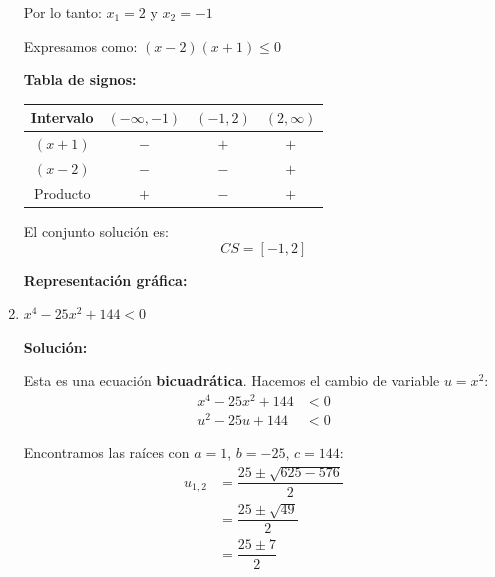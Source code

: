 \documentclass[12pt]{article}
\newcommand{\solucion}{%
    \vspace{0.8em}%
    \textbf{Solución:}%
}
\begin{document}
\begin{enumerate}[label=\alph*.-]
    Por lo tanto: $x_1 = 2$ y $x_2 = -1$

    Expresamos como: $(x - 2)(x + 1) \leq 0$

    \textbf{Tabla de signos:}

    \begin{center}
    \begin{tabular}{|c|c|c|c|}
    \hline
    Intervalo & $(-\infty, -1)$ & $(-1, 2)$ & $(2, \infty)$ \\
    \hline
    $(x+1)$ & $-$ & $+$ & $+$ \\
    \hline
    $(x-2)$ & $-$ & $-$ & $+$ \\
    \hline
    Producto & $+$ & $-$ & $+$ \\
    \hline
    \end{tabular}
    \end{center}

    El conjunto solución es:
    \[
    \boxed{CS = [-1, 2]}
    \]

    \textbf{Representación gráfica:}

    \begin{center}
    \end{center}

    \newpage
    \item $x^4 - 25x^2 + 144 < 0$

    \solucion

    Esta es una ecuación \textbf{bicuadrática}. Hacemos el cambio de variable $u = x^2$:
    \begin{align*}
    x^4 - 25x^2 + 144 &< 0 \\[0.3em]
    u^2 - 25u + 144 &< 0
    \end{align*}

    Encontramos las raíces con $a = 1$, $b = -25$, $c = 144$:
    \begin{align*}
    u_{1,2} &= \dfrac{25 \pm \sqrt{625 - 576}}{2} \\[0.3em]
    &= \dfrac{25 \pm \sqrt{49}}{2} \\[0.3em]
    &= \dfrac{25 \pm 7}{2}
    \end{align*}


\end{enumerate}
\end{document}
